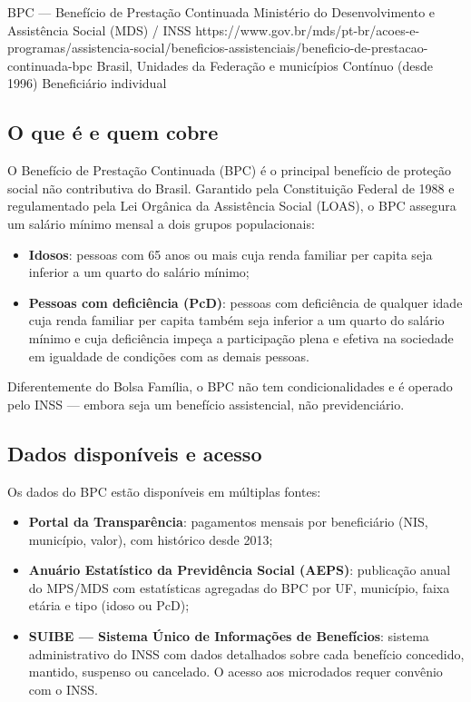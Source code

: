 \ficharapida
  {BPC — Benefício de Prestação Continuada}
  {Ministério do Desenvolvimento e Assistência Social (MDS) / INSS}
  {https://www.gov.br/mds/pt-br/acoes-e-programas/assistencia-social/beneficios-assistenciais/beneficio-de-prestacao-continuada-bpc}
  {Brasil, Unidades da Federação e municípios}
  {Contínuo (desde 1996)}
  {Beneficiário individual}

\subsection{O que é e quem cobre}

O Benefício de Prestação Continuada (BPC) é o principal benefício de proteção social não contributiva do Brasil. Garantido pela Constituição Federal de 1988 e regulamentado pela Lei Orgânica da Assistência Social (LOAS), o BPC assegura um salário mínimo mensal a dois grupos populacionais:

\begin{itemize}
  \item \textbf{Idosos}: pessoas com 65 anos ou mais cuja renda familiar per capita seja inferior a um quarto do salário mínimo;
  \item \textbf{Pessoas com deficiência (PcD)}: pessoas com deficiência de qualquer idade cuja renda familiar per capita também seja inferior a um quarto do salário mínimo e cuja deficiência impeça a participação plena e efetiva na sociedade em igualdade de condições com as demais pessoas.
\end{itemize}

Diferentemente do Bolsa Família, o BPC não tem condicionalidades e é operado pelo INSS — embora seja um benefício assistencial, não previdenciário.

\subsection{Dados disponíveis e acesso}

Os dados do BPC estão disponíveis em múltiplas fontes:

\begin{itemize}
  \item \textbf{Portal da Transparência}: pagamentos mensais por beneficiário (NIS, município, valor), com histórico desde 2013;
  \item \textbf{Anuário Estatístico da Previdência Social (AEPS)}: publicação anual do MPS/MDS com estatísticas agregadas do BPC por UF, município, faixa etária e tipo (idoso ou PcD);
  \item \textbf{SUIBE — Sistema Único de Informações de Benefícios}: sistema administrativo do INSS com dados detalhados sobre cada benefício concedido, mantido, suspenso ou cancelado. O acesso aos microdados requer convênio com o INSS.
\end{itemize}


